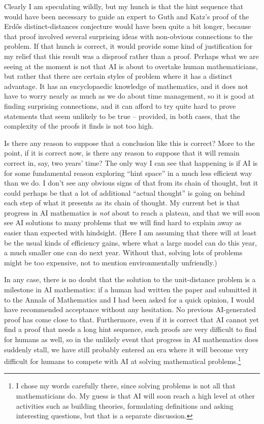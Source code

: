 \documentclass[11pt,reqno]{amsart}
\numberwithin{equation}{section}
\theoremstyle{definition}
\theoremstyle{remark}
\begin{document}
Clearly I am speculating wildly, but my hunch is that the hint sequence that would have been necessary to guide an expert to Guth and Katz's proof of the Erd\H os distinct-distances conjecture would have been quite a bit longer, because that proof involved several surprising ideas with non-obvious connections to the problem. If that hunch is correct, it would provide some kind of justification for my relief that this result was a disproof rather than a proof. Perhaps what we are seeing at the moment is not that AI is about to overtake human mathematicians, but rather that there are certain styles of problem where it has a distinct advantage. It has an encyclopaedic knowledge of mathematics, and it does not have to worry nearly as much as we do about time management, so it is good at finding surprising connections, and it can afford to try quite hard to prove statements that seem unlikely to be true -- provided, in both cases, that the complexity of the proofs it finds is not too high. 

Is there any reason to suppose that a conclusion like this is correct? More to the point, if it is correct now, is there any reason to suppose that it will remain correct in, say, two years' time? The only way I can see that happening is if AI is for some fundamental reason exploring ``hint space'' in a much less efficient way than we do. I don't see any obvious signs of that from its chain of thought, but it could perhaps be that a lot of additional ``actual thought'' is going on behind each step of what it presents as its chain of thought. My current bet is that progress in AI mathematics is \emph{not} about to reach a plateau, and that we will soon see AI solutions to many problems that we will find hard to explain away as easier than expected with hindsight. (Here I am assuming that there will at least be the usual kinds of efficiency gains, where what a large model can do this year, a much smaller one can do next year. Without that, solving lots of problems might be too expensive, not to mention environmentally unfriendly.)

In any case, there is no doubt that the solution to the unit-distance problem is a milestone in AI mathematics: if a human had written the paper and submitted it to the Annals of Mathematics and I had been asked for a quick opinion, I would have recommended acceptance without any hesitation. No previous AI-generated proof has come close to that. Furthermore, even if it is correct that AI cannot yet find a proof that needs a long hint sequence, such proofs are very difficult to find for humans as well, so in the unlikely event that progress in AI mathematics does suddenly stall, we have still probably entered an era where it will become very difficult for humans to compete with AI at solving mathematical problems.\footnote{I chose my words carefully there, since solving problems is not all that mathematicians do. My guess is that AI will soon reach a high level at other activities such as building theories, formulating definitions and asking interesting questions, but that is a separate discussion.} 
\end{document}
